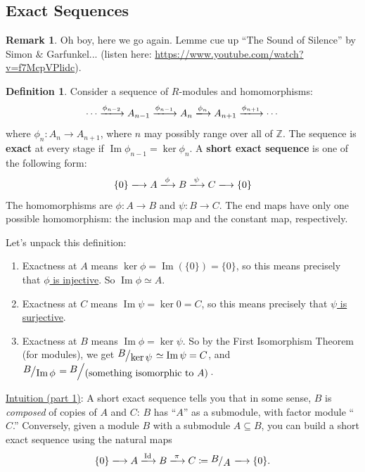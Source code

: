 \documentclass[12pt]{article}
\newcommand{\z}{\mathbb{Z}}
\newcommand{\ita}[1]{\textit{#1}}
\newcommand{\quotient}[2]{{\makebox[\width-2.3pt][l]{\raisebox{.2em}{$#1$}}\left/\raisebox{-.2em}{$#2$}\right.}}
\theoremstyle{definition}
\newtheorem{definition}[theorem]{Definition}
\newtheorem*{remark}{Remark}
\DeclareMathOperator\Id{Id}
\DeclareMathOperator\im{Im}
\begin{document}
\subsection{Exact Sequences}
\begin{remark}
    Oh boy, here we go again. Lemme cue up ``The Sound of Silence'' by Simon $\&$ Garfunkel... (listen here: \url{https://www.youtube.com/watch?v=f7McpVPlidc}).
\end{remark}
\begin{definition}
    Consider a sequence of $R$-modules and homomorphisms:
    \begin{equation}
        \dotsb \xlongrightarrow{\phi_{n-2}}A_{n-1}\xlongrightarrow{\phi_{n-1}}A_n\xlongrightarrow{\phi_n} A_{n+1}\xlongrightarrow{\phi_{n+1}}\dotsb
    \end{equation}
    where $\phi_n:A_n\to A_{n+1}$, where $n$ may possibly range over all of $\z$. The sequence is \textbf{exact} at every stage if $\im\phi_{n-1}=\ker\phi_n$.
    A \textbf{short exact sequence} is one of the following form:
    \begin{equation}
        \{0\}\xlongrightarrow{} A\xlongrightarrow{\phi}B\xlongrightarrow{\psi}C\xlongrightarrow{}\{0\}
    \end{equation}
    The homomorphisms are $\phi:A\to B$ and $\psi:B\to C$. The end maps have only one possible homomorphism: the inclusion map and the constant map, respectively.
\end{definition}
Let's unpack this definition:
\begin{enumerate}
    \item Exactness at $A$ means $\ker\phi=\im(\{0\})=\{0\}$, so this means precisely that \underline{$\phi$ is injective}. So $\im\phi\simeq A$.
    \item Exactness at $C$ means $\im\psi=\ker0=C$, so this means precisely that \underline{$\psi$ is surjective}.
    \item Exactness at $B$ means $\im\phi=\ker\psi$. So by the First Isomorphism Theorem (for modules), we get $\quotient{B}{\ker\psi}\simeq\im\psi=C$, and $\quotient{B}{\im\phi}=\quotient{B}{(\text{something isomorphic to }A)}$.
\end{enumerate}
\underline{Intuition (part 1)}: A short exact sequence tells you that in some sense, $B$ is \ita{composed} of copies of $A$ and $C$: $B$ has ``$A$'' as a submodule, with factor module ``$C$.'' Conversely, given a module $B$ with a submodule $A\subseteq B$, you can build a short exact sequence using the natural maps
\begin{equation}
    \{0\}\xlongrightarrow{} A\xlongrightarrow{\Id}B\xlongrightarrow{\pi}C\coloneqq \quotient{B}{A}\xlongrightarrow{}\{0\}.
\end{equation}
\end{document}
